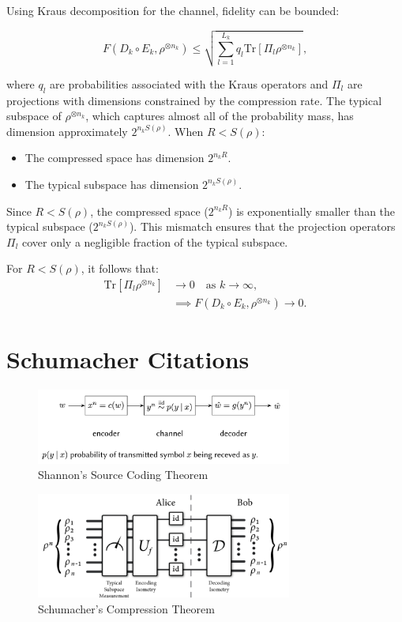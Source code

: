 \begin{flushleft}
Using Kraus decomposition for the channel, fidelity can be bounded:
\end{flushleft}
\[
F(D_k \circ E_k, \rho^{\otimes n_k}) \leq \sqrt{\sum_{l=1}^{L_k} q_l \text{Tr}[\Pi_l \rho^{\otimes n_k}]},
\]

\begin{flushleft}
where \(q_l\) are probabilities associated with the Kraus operators and \(\Pi_l\) are projections with dimensions constrained by the compression rate.
\newline
\newline
The typical subspace of \(\rho^{\otimes n_k}\), which captures almost all of the probability mass, has dimension approximately \(2^{n_k S(\rho)}\). When \(R < S(\rho)\):
\end{flushleft}

\begin{itemize}
    \item The compressed space has dimension \(2^{n_k R}\).
    \item The typical subspace has dimension \(2^{n_k S(\rho)}\).
\end{itemize}

\begin{flushleft}
Since \(R < S(\rho)\), the compressed space (\(2^{n_k R}\)) is exponentially smaller than the typical subspace (\(2^{n_k S(\rho)}\)). This mismatch ensures that the projection operators \(\Pi_l\) cover only a negligible fraction of the typical subspace.
\end{flushleft}

For \(R < S(\rho)\), it follows that:
\[
\begin{aligned}
    \text{Tr}[\Pi_l \rho^{\otimes n_k}] &\to 0 \quad \text{as } k \to \infty, \\
    &\implies F(D_k \circ E_k, \rho^{\otimes n_k}) \to 0.
\end{aligned}
\]

\section{Schumacher Citations}
\begin{figure}[h]
    \centering
    \includegraphics[width=0.75\textwidth]{figures/shannon_pic.png}
    \caption{Shannon's Source Coding Theorem \cite{jahooShannonsNoisy}}
\end{figure}

\begin{figure}[h]
    \centering
    \includegraphics[width=0.75\textwidth]{figures/schumacher.png}
    \caption{Schumacher's Compression Theorem \cite{PhysRevA.51.2738}}
\end{figure}
